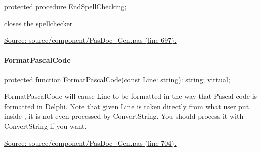 \documentclass{report}
\newif\ifpdf
\begin{document}
\label{PasDoc_Gen.TDocGenerator-EndSpellChecking}
\begin{list}{}{
\setlength{\itemindent}{0cm}
\setlength{\listparindent}{0cm}
\setlength{\leftmargin}{\evensidemargin}
\addtolength{\leftmargin}{\tmplength}
\settowidth{\labelsep}{X}
\addtolength{\leftmargin}{\labelsep}
\setlength{\labelwidth}{\tmplength}
}
\item[\textbf{Declaration}\hfill]
\ifpdf
\begin{flushleft}
\fi
\begin{ttfamily}
protected procedure EndSpellChecking;\end{ttfamily}

\ifpdf
\end{flushleft}
\fi

\par
\item[\textbf{Description}]
closes the spellchecker\par
\href{https://github.com/pasdoc/pasdoc/blob/master/source/component/PasDoc_Gen.pas#L697}{Source: source/component/PasDoc{\_}Gen.pas (line 697).}

\end{list}
\paragraph*{FormatPascalCode}\hspace*{\fill}

\label{PasDoc_Gen.TDocGenerator-FormatPascalCode}
\begin{list}{}{
\setlength{\itemindent}{0cm}
\setlength{\listparindent}{0cm}
\setlength{\leftmargin}{\evensidemargin}
\addtolength{\leftmargin}{\tmplength}
\settowidth{\labelsep}{X}
\addtolength{\leftmargin}{\labelsep}
\setlength{\labelwidth}{\tmplength}
}
\item[\textbf{Declaration}\hfill]
\ifpdf
\begin{flushleft}
\fi
\begin{ttfamily}
protected function FormatPascalCode(const Line: string): string; virtual;\end{ttfamily}

\ifpdf
\end{flushleft}
\fi

\par
\item[\textbf{Description}]
FormatPascalCode will cause Line to be formatted in the way that Pascal code is formatted in Delphi. Note that given Line is taken directly from what user put inside \texttt{}, it is not even processed by ConvertString. You should process it with ConvertString if you want.\par
\href{https://github.com/pasdoc/pasdoc/blob/master/source/component/PasDoc_Gen.pas#L704}{Source: source/component/PasDoc{\_}Gen.pas (line 704).}

\end{list}
\end{document}
